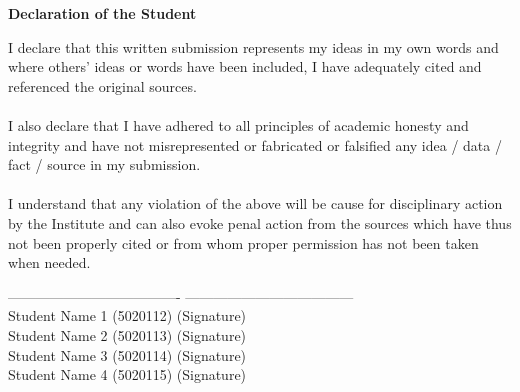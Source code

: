 \documentclass[oneside,12pt]{Classes/CUEDthesisPSnPDF}
\theoremstyle{definition}
\begin{document}
\vspace*{2\baselineskip}
\begin{center}\begin{Large}\textbf{Declaration of the Student}\end{Large}\end{center}
\vspace*{2\baselineskip}
I declare that this written submission represents my ideas in my own words and where others' ideas or words have been included, I have adequately cited and referenced the original sources.\\
\\I also declare that I have adhered to all principles of academic honesty and integrity and have not misrepresented or fabricated or falsified any idea / data / fact / source in my submission.\\ 
\\I understand that any violation of the above will be cause for disciplinary action by the Institute and can also evoke penal action from the sources which have thus not been properly cited or from whom proper permission has not been taken when needed.
\vspace*{1\baselineskip}
		\begin{center}
		
		\begin{small}
                             -------------------------------------     \hspace{0.5in} ------------------------------------\\
			Student Name 1 (5020112)        \hspace{1.2in}                              (Signature)\\
			Student Name 2 (5020113)                \hspace{1.2in}                      (Signature)\\
			Student Name 3 (5020114)               \hspace{1.2in}                       (Signature)\\
			Student Name 4 (5020115)                     \hspace{1.2in}                 (Signature) \\
                            		\end{small}
\end{center}
\vspace*{1\baselineskip}
\end{document}

